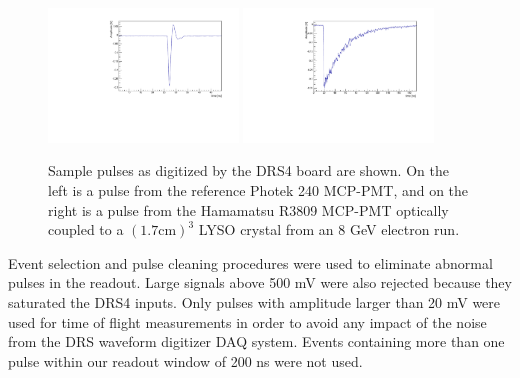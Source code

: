 \documentclass[12pt]{article}
\begin{document}
\begin{figure}[h] \centering
\includegraphics[width=0.45\textwidth]{figs/RefPulse} 
\includegraphics[width=0.45\textwidth]{figs/run064_event506} 
\caption{Sample pulses as digitized by the DRS4 board are shown. 
On the left is a  pulse from the reference Photek 240 MCP-PMT, 
and on the right is a pulse from the Hamamatsu R3809 MCP-PMT
optically coupled to a $(1.7\mathrm{ cm})^3$ LYSO crystal 
from an 8 GeV electron run.} 
\label{fig:PulseShapes}
\end{figure}

Event selection and pulse cleaning procedures were used to eliminate abnormal
pulses in the readout. Large signals above 500 mV were also rejected because
they saturated the DRS4 inputs. Only pulses with amplitude 
larger than 20 mV were used for time of flight measurements in order to 
avoid any impact of the noise from the DRS waveform digitizer DAQ system. 
Events containing more than one pulse within our readout window of 200 ns 
were not used. 
\end{document}
